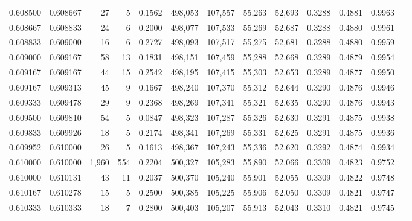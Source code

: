 \begin{tabular}{rrrrrrrrrrrrr}
0.608500 & 0.608667 &    27 &   5 &                                     0.1562 & 498,053 & 107,557 &  55,263 &  52,693 & 0.3288 & 0.4881 & 0.9963 \\
0.608667 & 0.608833 &    24 &   6 &                                     0.2000 & 498,077 & 107,533 &  55,269 &  52,687 & 0.3288 & 0.4880 & 0.9961 \\
0.608833 & 0.609000 &    16 &   6 &                                     0.2727 & 498,093 & 107,517 &  55,275 &  52,681 & 0.3288 & 0.4880 & 0.9959 \\
0.609000 & 0.609167 &    58 &  13 &                                     0.1831 & 498,151 & 107,459 &  55,288 &  52,668 & 0.3289 & 0.4879 & 0.9954 \\
0.609167 & 0.609167 &    44 &  15 &                                     0.2542 & 498,195 & 107,415 &  55,303 &  52,653 & 0.3289 & 0.4877 & 0.9950 \\
0.609167 & 0.609313 &    45 &   9 &                                     0.1667 & 498,240 & 107,370 &  55,312 &  52,644 & 0.3290 & 0.4876 & 0.9946 \\
0.609333 & 0.609478 &    29 &   9 &                                     0.2368 & 498,269 & 107,341 &  55,321 &  52,635 & 0.3290 & 0.4876 & 0.9943 \\
0.609500 & 0.609810 &    54 &   5 &                                     0.0847 & 498,323 & 107,287 &  55,326 &  52,630 & 0.3291 & 0.4875 & 0.9938 \\
0.609833 & 0.609926 &    18 &   5 &                                     0.2174 & 498,341 & 107,269 &  55,331 &  52,625 & 0.3291 & 0.4875 & 0.9936 \\
0.609952 & 0.610000 &    26 &   5 &                                     0.1613 & 498,367 & 107,243 &  55,336 &  52,620 & 0.3292 & 0.4874 & 0.9934 \\
0.610000 & 0.610000 & 1,960 & 554 &                                     0.2204 & 500,327 & 105,283 &  55,890 &  52,066 & 0.3309 & 0.4823 & 0.9752 \\
0.610000 & 0.610131 &    43 &  11 &                                     0.2037 & 500,370 & 105,240 &  55,901 &  52,055 & 0.3309 & 0.4822 & 0.9748 \\
0.610167 & 0.610278 &    15 &   5 &                                     0.2500 & 500,385 & 105,225 &  55,906 &  52,050 & 0.3309 & 0.4821 & 0.9747 \\
0.610333 & 0.610333 &    18 &   7 &                                     0.2800 & 500,403 & 105,207 &  55,913 &  52,043 & 0.3310 & 0.4821 & 0.9745 \\

\end{tabular}
